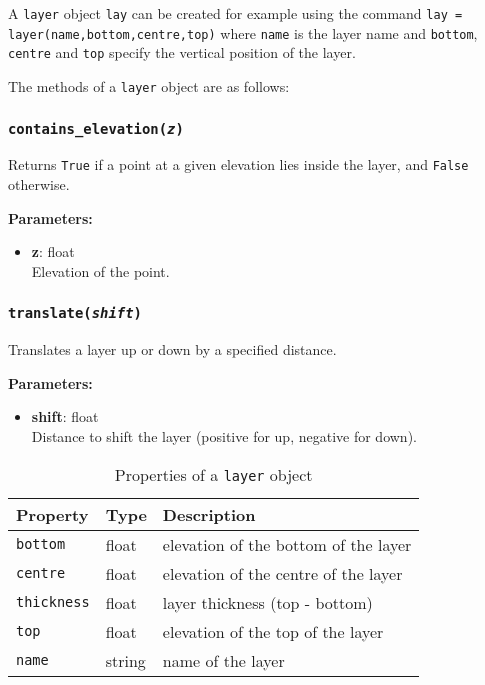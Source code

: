 A \texttt{layer} object \texttt{lay} can be created for example using the command \texttt{lay = layer(name,bottom,centre,top)} where \texttt{name} is the layer name and \texttt{bottom}, \texttt{centre} and \texttt{top} specify the vertical position of the layer.

The methods of a \texttt{layer} object are as follows:

\subsubsection{\texttt{contains\_elevation(\emph{z})}}

Returns \texttt{True} if a point at a given elevation lies inside the layer, and \texttt{False} otherwise.

\textbf{Parameters:}
\begin{itemize}
\item \textbf{z}: float\\
   Elevation of the point.
\end{itemize}

\subsubsection{\texttt{translate(\emph{shift})}}

Translates a layer up or down by a specified distance.

\textbf{Parameters:}
\begin{itemize}
\item \textbf{shift}: float\\
  Distance to shift the layer (positive for up, negative for down).
\end{itemize}

\begin{table}
  \begin{center}
    \begin{tabular}{|l|l|l|}
      \hline
      \textbf{Property} & \textbf{Type} & \textbf{Description}\\
      \hline
      \texttt{bottom} & float & elevation of the bottom of the layer \\
      \texttt{centre} & float & elevation of the centre of the layer \\
      \texttt{thickness} & float & layer thickness (top - bottom) \\
      \texttt{top} & float & elevation of the top of the layer \\
      \texttt{name} & string & name of the layer \\
      \hline
    \end{tabular}
    \caption{Properties of a \texttt{layer} object}
    \label{tb:layer_properties}
  \end{center}
\end{table}

